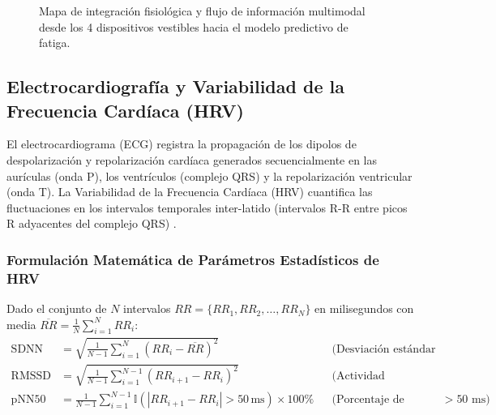\begin{figure}[H]
    \caption{Mapa de integración fisiológica y flujo de información multimodal desde los 4 dispositivos vestibles hacia el modelo predictivo de fatiga.}
    \label{fig:sensores_diagrama_detallado}
\end{figure}

\subsection{Electrocardiografía y Variabilidad de la Frecuencia Cardíaca (HRV)}

El electrocardiograma (ECG) registra la propagación de los dipolos de despolarización y repolarización cardíaca generados secuencialmente en las aurículas (onda P), los ventrículos (complejo QRS) y la repolarización ventricular (onda T). La Variabilidad de la Frecuencia Cardíaca (HRV) cuantifica las fluctuaciones en los intervalos temporales inter-latido (intervalos R-R entre picos R adyacentes del complejo QRS) \cite{taskforce1996heart, tarvainen2014kubios}.

\subsubsection{Formulación Matemática de Parámetros Estadísticos de HRV}
Dado el conjunto de $N$ intervalos $RR = \{RR_1, RR_2, \dots, RR_N\}$ en milisegundos con media $\overline{RR} = \frac{1}{N}\sum_{i=1}^N RR_i$:
\begin{align}
    \text{SDNN} &= \sqrt{\frac{1}{N-1}\sum_{i=1}^N (RR_i - \overline{RR})^2} && \text{(Desviación estándar global)} \\
    \text{RMSSD} &= \sqrt{\frac{1}{N-1}\sum_{i=1}^{N-1} (RR_{i+1} - RR_i)^2} && \text{(Actividad parasimpática de alta frecuencia)} \\
    \text{pNN50} &= \frac{1}{N-1}\sum_{i=1}^{N-1} \mathbb{I}(|RR_{i+1} - RR_i| > 50\,\text{ms}) \times 100\% && \text{(Porcentaje de diferencias $>50$ ms)}
\end{align}

